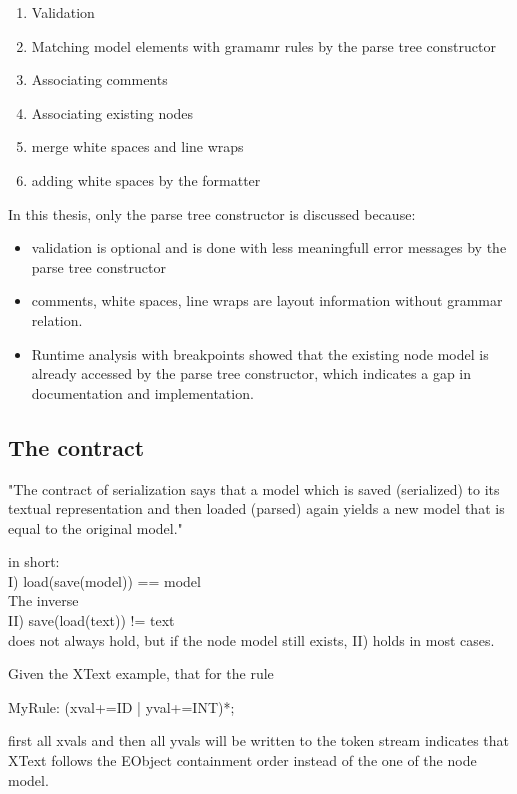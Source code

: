 \begin{enumerate}
	\item Validation
	\item Matching model elements with gramamr rules by the parse tree constructor
	\item Associating comments
	\item Associating existing nodes
	\item merge white spaces and line wraps
	\item adding white spaces by the formatter
\end{enumerate}

In this thesis, only the parse tree constructor is discussed because:
\begin{itemize}
	\item validation is optional and is done with less meaningfull error messages by the parse tree constructor
	\item comments, white spaces, line wraps are layout information without grammar relation.
	\item Runtime analysis with breakpoints showed that the existing node model is already accessed by the parse tree constructor, which indicates a gap in documentation and implementation.
\end{itemize}

\subsection{The contract}
"The contract of serialization says that a model which is saved (serialized) to its textual representation and then loaded (parsed) again yields a new model that is equal to the original model."\cite{XTextMan}

in short:\\
I) load(save(model)) == model\\
The inverse\\
II) save(load(text)) != text\\
does not always hold, but if the node model still exists, II) holds in most cases. 

Given the XText example, that for the rule
\begin{xtxt}
MyRule: (xval+=ID | yval+=INT)*; 
\end{xtxt}
first all xvals and then all yvals will be written to the token stream indicates that XText follows the  EObject containment order instead of the one of the node model.

